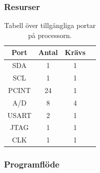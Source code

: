 \documentclass{article}
\begin{document}
\subsubsection{Resurser}
\begin{table}[H]
\centering
\caption{Tabell över tillgängliga portar på processorn.}
\begin{tabular}{ | c | c | c | c |}
\hline
\textbf{Port} & \textbf{Antal} & \textbf{Krävs} \\
\hline
SDA & 1 & 1 \\
\hline
SCL & 1 & 1 \\
\hline
PCINT & 24 & 1 \\
\hline
A/D & 8 & 4 \\
\hline
USART & 2 & 1 \\
\hline
JTAG & 1 & 1 \\
\hline
CLK & 1 & 1 \\
\hline
\end{tabular}
\end{table}

\subsubsection{Programflöde}
\end{document}
